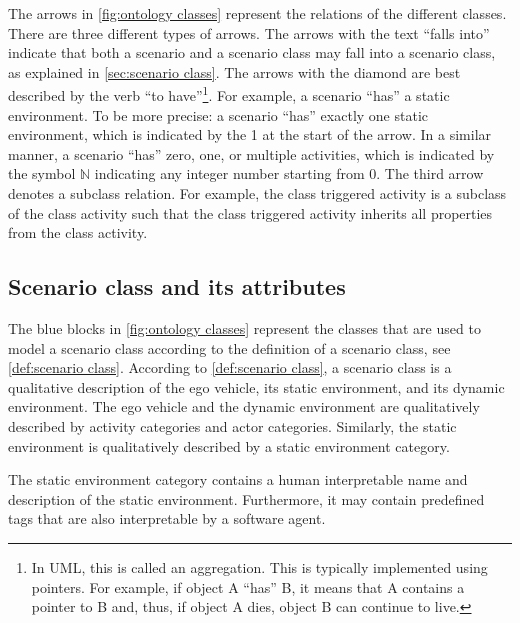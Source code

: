 The arrows in \cref{fig:ontology classes} represent the relations of the different classes. There are three different types of arrows. The arrows with the text ``falls into'' indicate that both a scenario and a scenario class may fall into a scenario class, as explained in \cref{sec:scenario class}. The arrows with the diamond are best described by the verb ``to have''\footnote{In UML, this is called an aggregation. \cbstartb This is typically implemented using pointers. For example, if object A ``has'' B, it means that A contains a pointer to B and, thus, if object A dies, object B can continue to live.\cbend}. For example, a scenario ``has'' a static environment. To be more precise: a scenario ``has'' exactly one static environment, which is indicated by the 1 at the start of the arrow. In a similar manner, a scenario ``has'' zero, one, or multiple activities, which is indicated by the symbol $\mathbb{N}$ indicating any integer number starting from 0. The third arrow denotes a subclass relation. For example, the class triggered activity is a subclass of the class activity such that the class triggered activity inherits all properties from the class activity.



\subsection{Scenario class and its attributes}
\label{sec:domain scenario class}

The blue blocks in \cref{fig:ontology classes} represent the classes that are used to model a scenario class according to the definition of a scenario class, see \cref{def:scenario class}. According to \cref{def:scenario class}, a scenario class is a qualitative description of the ego vehicle, its static environment, and its dynamic environment. The ego vehicle and the dynamic environment are qualitatively described by activity categories and actor categories. Similarly, the static environment is qualitatively described by a static environment category. 

The static environment category contains a human interpretable name and description of the static environment. Furthermore, it may contain predefined tags that are also interpretable by a software agent. 

